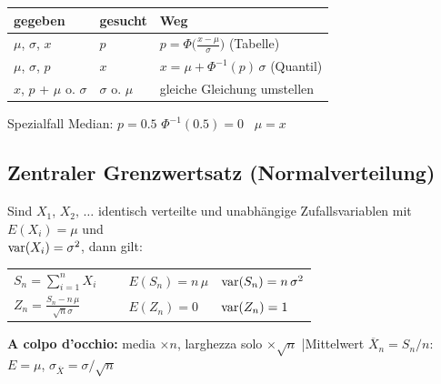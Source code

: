 \vspace{0.2cm}

\renewcommand{\arraystretch}{1.4}
\begin{tabular}{|l|l|l|}
	\hline
	\textbf{gegeben}			& \textbf{gesucht}		& \textbf{Weg} 											\\
	\hline
	$\mu$, $\sigma$, $x$		& $p$					& $p = \Phi\big(\frac{x-\mu}{\sigma}\big)$ (Tabelle)	\\
	$\mu$, $\sigma$, $p$		& $x$					& $x = \mu + \Phi^{-1}(p)\,\sigma$ (Quantil)			\\
	$x$, $p$ + $\mu$ o. $\sigma$	& $\sigma$ o. $\mu$	& gleiche Gleichung umstellen							\\
	\hline
\end{tabular}
\renewcommand{\arraystretch}{1}

\vspace{0.1cm}
Spezialfall Median: $p = 0.5$ \qquad  $\Phi^{-1}(0.5) = 0$ \qquad \textrightarrow\ $\mu = x$


\subsection{Zentraler Grenzwertsatz (Normalverteilung)}

Sind $X_1$, $X_2, \, \ldots$ identisch verteilte und unabhängige Zufallsvariablen mit $E(X_i) = \mu$ und \\
$\mathrm{var}(X_i) = \sigma^2$, dann gilt:

\renewcommand{\arraystretch}{2}
\begin{tabular}{l c l l}
	$S_n = \sum\limits_{i=1}^n X_i$ 				& \textrightarrow\	& $E(S_n) = n \, \mu$ 	& $\mathrm{var}(S_n) = n \, \sigma^2$	\\
	$Z_n = \frac{S_n - n \, \mu}{\sqrt{n} \sigma}$ 	& \textrightarrow\ 	& $E(Z_n) = 0$ 			& $\mathrm{var}(Z_n) = 1$
\end{tabular}
\renewcommand{\arraystretch}{1}

\begin{center}

{\scriptsize \textbf{A colpo d'occhio:} media $\times n$, larghezza solo $\times\sqrt{n}$ \quad|\quad Mittelwert $\overline{X}_n = S_n/n$: \; $E = \mu$, \; $\sigma_{\overline{X}} = \sigma/\sqrt{n}$\par}
\end{center}

